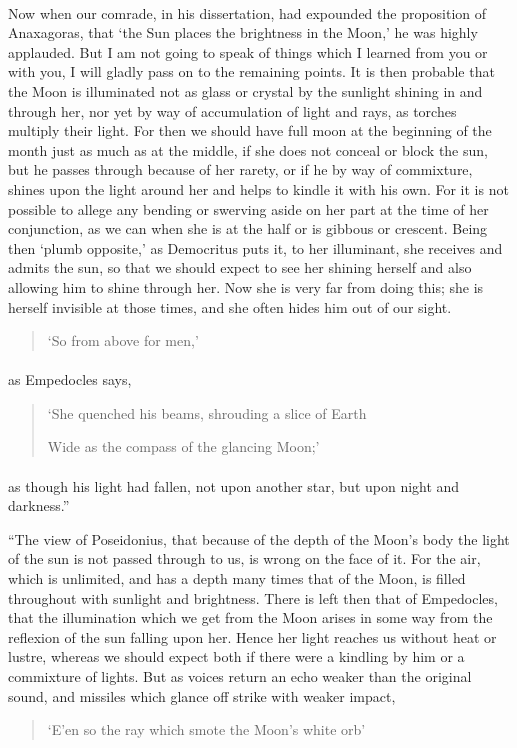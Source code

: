 \documentclass[a4paper, 11pt, oneside, polutonikogreek, english]{article}
\begin{document}
\paragraph{}
Now when our comrade, in his dissertation, had expounded the proposition of Anaxagoras, that `the Sun places the brightness in the Moon,' he was highly applauded. But I am not going to speak of things which I learned from you or with you, I will gladly pass on to the remaining points. It is then probable that the Moon is illuminated not as glass or crystal by the sunlight shining in and through her, nor yet by way of accumulation of light and rays, as torches multiply their light. For then we should have full moon at the beginning of the month just as much as at the middle, if she does not conceal or block the sun, but he passes through because of her rarety, or if he by way of commixture, shines upon the light around her and helps to kindle it with his own. For it is not possible to allege any bending or swerving aside on her part at the time of her conjunction, as we can when she is at the half or is gibbous or crescent. Being then `plumb opposite,' as Democritus puts it, to her illuminant, she receives and admits the sun, so that we should expect to see her shining herself and also allowing him to shine through her. Now she is very far from doing this; she is herself invisible at those times, and she often hides him out of our sight.
\begin{quotation}
`So from above for men,'
\end{quotation}
\paragraph{}
as Empedocles says,
\begin{quotation}
`She quenched his beams, shrouding a slice of Earth

Wide as the compass of the glancing Moon;'
\end{quotation}
\paragraph{}
as though his light had fallen, not upon another star, but upon night and darkness.''

``The view of Poseidonius, that because of the depth of the Moon's body the light of the sun is not passed through to us, is wrong on the face of it. For the air, which is unlimited, and has a depth many times that of the Moon, is filled throughout with sunlight and brightness. There is left then that of Empedocles, that the illumination which we get from the Moon arises in some way from the reflexion of the sun falling upon her. Hence her light reaches us without heat or lustre, whereas we should expect both if there were a kindling by him or a commixture of lights. But as voices return an echo weaker than the original sound, and missiles which glance off strike with weaker impact,
\begin{quotation}
`E'en so the ray which smote the Moon's white orb'
\end{quotation}
\end{document}
